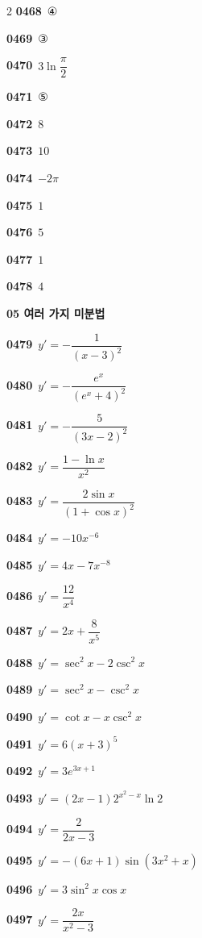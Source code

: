 \documentclass[10pt,a4paper]{article}
\begin{document}
\begin{multicols}{2}
\noindent\textbf{0468}\ ④\par
\noindent\textbf{0469}\ ③\par
\noindent\textbf{0470}\ $3\ln\dfrac{\pi}{2}$\par
\noindent\textbf{0471}\ ⑤\par
\noindent\textbf{0472}\ $8$\par
\noindent\textbf{0473}\ $10$\par
\noindent\textbf{0474}\ $-2\pi$\par
\noindent\textbf{0475}\ $1$\par
\noindent\textbf{0476}\ $5$\par
\noindent\textbf{0477}\ $1$\par
\noindent\textbf{0478}\ $4$\par
\noindent\textbf{05 여러 가지 미분법}\par\smallskip
\noindent\textbf{0479}\ $y'=-\dfrac{1}{(x-3)^2}$\par
\noindent\textbf{0480}\ $y'=-\dfrac{e^x}{(e^x+4)^2}$\par
\noindent\textbf{0481}\ $y'=-\dfrac{5}{(3x-2)^2}$\par
\noindent\textbf{0482}\ $y'=\dfrac{1-\ln x}{x^2}$\par
\noindent\textbf{0483}\ $y'=\dfrac{2\sin x}{(1+\cos x)^2}$\par
\noindent\textbf{0484}\ $y'=-10x^{-6}$\par
\noindent\textbf{0485}\ $y'=4x-7x^{-8}$\par
\noindent\textbf{0486}\ $y'=\dfrac{12}{x^4}$\par
\noindent\textbf{0487}\ $y'=2x+\dfrac{8}{x^5}$\par
\noindent\textbf{0488}\ $y'=\sec^2 x-2\csc^2 x$\par
\noindent\textbf{0489}\ $y'=\sec^2 x-\csc^2 x$\par
\noindent\textbf{0490}\ $y'=\cot x-x\csc^2 x$\par
\noindent\textbf{0491}\ $y'=6(x+3)^5$\par
\noindent\textbf{0492}\ $y'=3e^{3x+1}$\par
\noindent\textbf{0493}\ $y'=(2x-1)2^{x^2-x}\ln 2$\par
\noindent\textbf{0494}\ $y'=\dfrac{2}{2x-3}$\par
\noindent\textbf{0495}\ $y'=-(6x+1)\sin(3x^2+x)$\par
\noindent\textbf{0496}\ $y'=3\sin^2 x\cos x$\par
\noindent\textbf{0497}\ $y'=\dfrac{2x}{x^2-3}$\par

\end{multicols}
\end{document}
